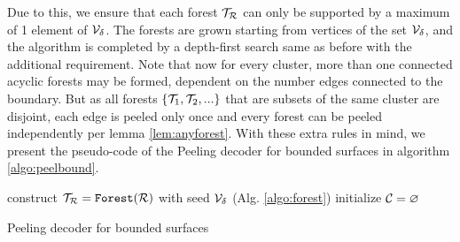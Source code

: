 Due to this, we ensure that each forest $\mathcal{T}_{\mathcal{R}}$ can only be supported by a maximum of 1 element of $\mathcal{V}_\delta$. The forests are grown starting from vertices of the set $\mathcal{V}_\delta$, and the algorithm is completed by a depth-first search same as before with the additional requirement. Note that now for every cluster, more than one connected acyclic forests may be formed, dependent on the number edges connected to the boundary. But as all forests $\{\mathcal{T}_1, \mathcal{T}_2,...\}$ that are subsets of the same cluster are disjoint, each edge is peeled only once and every forest can be peeled independently per lemma \ref{lem:anyforest}. With these extra rules in mind, we present the pseudo-code of the Peeling decoder for bounded surfaces in algorithm \ref{algo:peelbound}.

\begin{algorithm}[htb]
  \BlankLine
  \BlankLine
  construct $\mathcal{T}_{\mathcal{R}} = \texttt{Forest}(\mathcal{R})$ with seed $\mathcal{V}_\delta$ (Alg. \ref{algo:forest})\;
  initialize $\mathcal{C} = {\varnothing}$\;
  \BlankLine
  \caption{Peeling decoder for bounded surfaces \cite{delfosse2017linear}}\label{algo:peelbound}
\end{algorithm}






